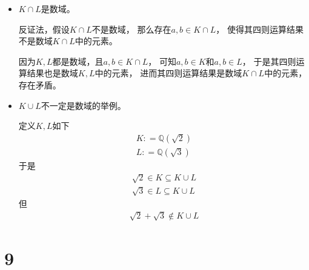 \documentclass{article}
\begin{document}
\begin{itemize}
      \item $K \cap L$是数域。

            反证法，假设$K \cap L$不是数域，
            那么存在$a, b \in K \cap L$，
            使得其四则运算结果不是数域$K \cap L$中的元素。

            因为$K, L$都是数域，且$a, b \in K \cap L$，
            可知$a, b \in K$和$a, b \in L$，
            于是其四则运算结果也是数域$K, L$中的元素，
            进而其四则运算结果是数域$K \cap L$中的元素，
            存在矛盾。

      \item $K \cup L$不一定是数域的举例。

            定义$K,L$如下
            \begin{align*}
                  K : = \mathbb{Q}(\sqrt{2}) \\
                  L : = \mathbb{Q}(\sqrt{3})
            \end{align*}
            于是
            \begin{align*}
                  \sqrt{2} \in K \subseteq K \cup L \\
                  \sqrt{3} \in L \subseteq K \cup L
            \end{align*}
            但
            \begin{align*}
                  \sqrt{2} + \sqrt{3} \notin K \cup L
            \end{align*}
\end{itemize}

\section*{9}
\end{document}
